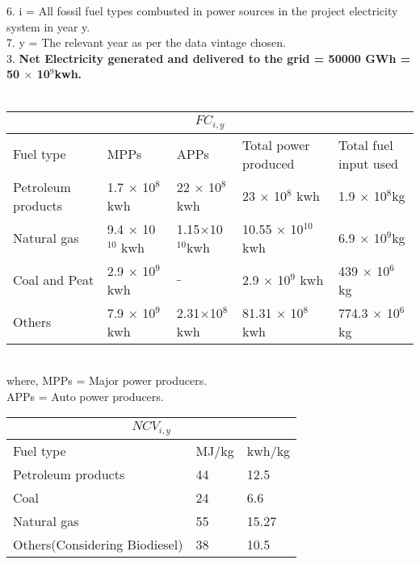 \documentclass[11pt]{exam}
\begin{document}
\begin{questions}
        6. i = All fossil fuel types combusted in power sources in the project electricity system in year y. \\
        
        7. y = The relevant year as per the data vintage chosen. \\ 
        
        3. \textbf{Net Electricity generated and delivered to the grid = 50000 GWh = 50 $\times$ 10$^{9}$kwh.} \\ \\
            
                               
\begin{tabular}{ |p{3.4cm}||p{2.5cm}|p{2.5cm}|p{3.3cm}|p{3.3cm}| }
\hline
\multicolumn{5}{|c|}{$FC_{i,y}$} \\
\hline
Fuel type & MPPs & APPs & Total power     produced & Total fuel input used\\
\hline
Petroleum products  & 1.7 $\times$ 10$^{8}$ kwh & 22 $\times$ 10$^{8}$ kwh & 23 $\times$ 10$^{8}$ kwh & 1.9 $\times$ 10$^{8}$kg\\
Natural gas  & 9.4 $\times$ 10$^{10}$ kwh & 1.15$\times$10$^{10}$kwh & 10.55 $\times$ 10$^{10}$ kwh & 6.9 $\times$ 10$^{9}$kg\\
Coal and Peat  & 2.9 $\times$ 10$^{9}$ kwh & $\_$ & 2.9 $\times$ 10$^{9}$ kwh & 439 $\times$ 10$^{6}$kg\\
Others  & 7.9 $\times$ 10$^{9}$ kwh & 2.31$\times$10$^{8}$ kwh & 81.31 $\times$ 10$^{8}$ kwh & 774.3 $\times$ 10$^{6}$kg\\
\hline
\end{tabular} \\ 

where, MPPs = Major power producers. \\
       APPs = Auto power producers. \\

\begin{tabular}{ |p{4cm}||p{3cm}|p{3cm}| }
\hline
\multicolumn{3}{|c|}{$NCV_{i,y}$} \\
\hline
Fuel type & MJ/kg & kwh/kg \\
\hline
Petroleum products  & 44 & 12.5 \\
Coal  & 24 & 6.6 \\
Natural gas  & 55 & 15.27 \\
Others(Considering Biodiesel)  & 38 & 10.5 \\
\hline
\end{tabular} \\ \\


\end{questions}
\end{document}
